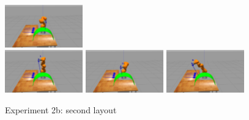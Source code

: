 \begin{frame}
\begin{center}
\begin{figure}[!htb]
\includegraphics[width=0.3\textwidth]{../images/robot_planner2b/robot_planner2b_6}\\
\includegraphics[width=0.3\textwidth]{../images/robot_planner2b/robot_planner2b_7}
\includegraphics[width=0.3\textwidth]{../images/robot_planner2b/robot_planner2b_8}
\includegraphics[width=0.3\textwidth]{../images/robot_planner2b/robot_planner2b_9}\\
\caption{Experiment 2b: second layout}
\end{figure}
\end{center}
\end{frame}

